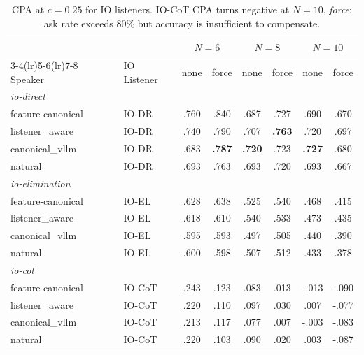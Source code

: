 \documentclass[11pt]{article}
\begin{document}
\begin{table}[ht]
\centering
\small
\setlength{\tabcolsep}{4pt}
\begin{tabular}{llcccccc}
\toprule
 & & \multicolumn{2}{c}{$N{=}6$} & \multicolumn{2}{c}{$N{=}8$} &
     \multicolumn{2}{c}{$N{=}10$} \\
\cmidrule(lr){3-4}\cmidrule(lr){5-6}\cmidrule(lr){7-8}
Speaker & IO Listener & none & force & none & force & none & force \\
\midrule
\multicolumn{8}{l}{\textit{io-direct}} \\
feature-canonical   & IO-DR & .760 & .840 & .687 & .727 & .690 & .670 \\
listener\_aware     & IO-DR & .740 & .790 & .707 & \textbf{.763} & .720 & .697 \\
canonical\_vllm     & IO-DR & .683 & \textbf{.787} & \textbf{.720} & .723 & \textbf{.727} & .680 \\
natural             & IO-DR & .693 & .763 & .693 & .720 & .693 & .667 \\
\midrule
\multicolumn{8}{l}{\textit{io-elimination}} \\
feature-canonical   & IO-EL & .628 & .638 & .525 & .540 & .468 & .415 \\
listener\_aware     & IO-EL & .618 & .610 & .540 & .533 & .473 & .435 \\
canonical\_vllm     & IO-EL & .595 & .593 & .497 & .505 & .440 & .390 \\
natural             & IO-EL & .600 & .598 & .507 & .512 & .433 & .378 \\
\midrule
\multicolumn{8}{l}{\textit{io-cot}} \\
feature-canonical   & IO-CoT & .243 & .123 & .083 & .013 & -.013 & -.090 \\
listener\_aware     & IO-CoT & .220 & .110 & .097 & .030 & .007 & -.077 \\
canonical\_vllm     & IO-CoT & .213 & .117 & .077 & .007 & -.003 & -.083 \\
natural             & IO-CoT & .220 & .103 & .090 & .020 & .003 & -.087 \\
\bottomrule
\end{tabular}
\caption{CPA at $c{=}0.25$ for IO listeners.
         IO-CoT CPA turns negative at $N{=}10$, \textit{force}: ask rate exceeds
         80\% but accuracy is insufficient to compensate.}
\label{tab:io-c025}
\end{table}
\end{document}
